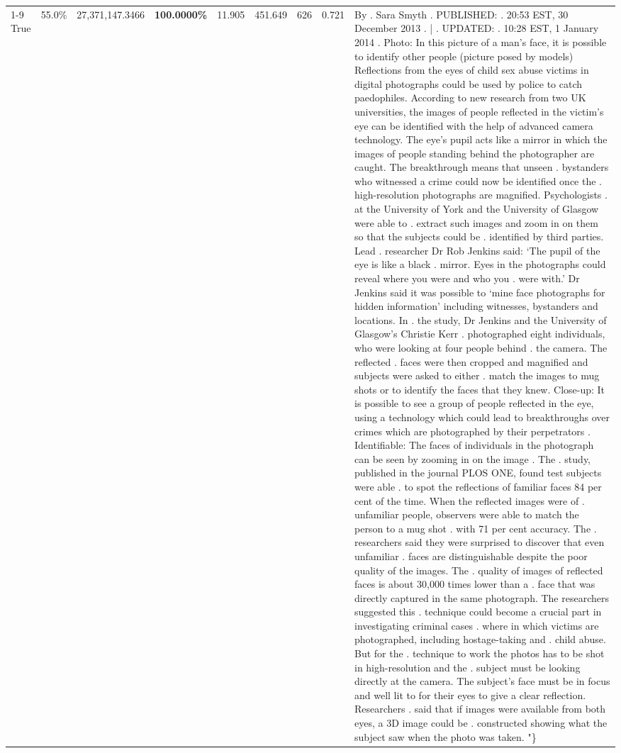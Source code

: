 \begin{table}[H]
\begin{tabular}{lllrlllll}
\cline{1-9}
True & 55.0\% & 27,371,147.3466 & \bfseries \color{red} 100.0000\% & 11.905 & 451.649 & 626 & 0.721 & By . Sara Smyth . PUBLISHED: . 20:53 EST, 30 December 2013 . | . UPDATED: . 10:28 EST, 1 January 2014 . Photo: In this picture of a man's face, it is possible to identify other people (picture posed by models) Reflections from the eyes of child sex abuse victims in digital photographs could be used by police to catch paedophiles. According to new research from two UK universities, the images of people reflected in the victim's eye can be identified with the help of advanced camera technology. The eye's pupil acts like a mirror in which the images of people standing behind the photographer are caught. The breakthrough means that unseen . bystanders who witnessed a crime could now be identified once the . high-resolution photographs are magnified. Psychologists . at the University of York and the University of Glasgow were able to . extract such images and zoom in on them so that the subjects could be . identified by third parties. Lead . researcher Dr Rob Jenkins said: ‘The pupil of the eye is like a black . mirror. Eyes in the photographs could reveal where you were and who you . were with.' Dr Jenkins said it was possible to ‘mine face photographs for hidden information' including witnesses, bystanders and locations. In . the study, Dr Jenkins and the University of Glasgow's Christie Kerr . photographed eight individuals, who were looking at four people behind . the camera. The reflected . faces were then cropped and magnified and subjects were asked to either . match the images to mug shots or to identify the faces that they knew. Close-up: It is possible to see a group of people reflected in the eye, using a technology which could lead to breakthroughs over crimes which are photographed by their perpetrators . Identifiable: The faces of individuals in the photograph can be seen by zooming in on the image . The . study, published in the journal PLOS ONE, found test subjects were able . to spot the reflections of familiar faces 84 per cent of the time. When the reflected images were of . unfamiliar people, observers were able to match the person to a mug shot . with 71 per cent accuracy. The . researchers said they were surprised to discover that even unfamiliar . faces are distinguishable despite the poor quality of the images. The . quality of images of reflected faces is about 30,000 times lower than a . face that was directly captured in the same photograph. The researchers suggested this . technique could become a crucial part in investigating criminal cases . where in which victims are photographed, including hostage-taking and . child abuse. But for the . technique to work the photos has to be shot in high-resolution and the . subject must be looking directly at the camera. The subject's face must be in focus and well lit to for their eyes to give a clear reflection. Researchers . said that if images were available from both eyes, a 3D image could be . constructed showing what the subject saw when the photo was taken. "\} \\

\end{tabular}
\end{table}
